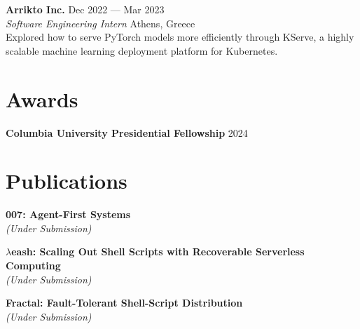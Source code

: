 \documentclass[margin, 12pt]{resume}
\newcommand{\cvName}{Nikos Pagonas}
\newcommand{\authors}[1]{#1\xspace}
\newcommand{\equalContributionNote}{(*equal contribution)\xspace}
\newcommand{\fellowship}[1]{\textbf{#1}\xspace}
\newcommand{\stitle}[1]{#1:\xspace}
\newcommand{\institution}[1]{\textbf{#1}\xspace}
\newcommand{\interval}[2]{#1 --- #2\xspace}
\newcommand{\paperTitle}[1]{\textbf{#1}\xspace}
\newcommand{\place}[1]{#1\xspace}
\newcommand{\role}[1]{\textit{#1}\xspace}
\newcommand{\underSubmission}{\textit{(Under Submission)}\xspace}
\newcommand{\venue}[1]{\textit{#1}\xspace}
\begin{document}
\begin{resume}

\institution{Arrikto Inc.} \hfill \interval{Dec 2022}{Mar 2023} \\
\role{Software Engineering Intern} \hfill \place{Athens, Greece} \\
Explored how to serve PyTorch models more efficiently through KServe, a highly scalable machine learning deployment platform for Kubernetes.

\section{Awards}

\fellowship{Columbia University Presidential Fellowship} \hfill 2024

\section{Publications}

\newcommand{\me}{\textbf{\cvName}\xspace}

\paperTitle{007: Agent-First Systems} \\
\underSubmission

\paperTitle{\( \lambda \)eash: Scaling Out Shell Scripts with Recoverable Serverless Computing} \\
\underSubmission 

\paperTitle{Fractal: Fault-Tolerant Shell-Script Distribution} \\
\underSubmission 


\end{resume}
\end{document}
